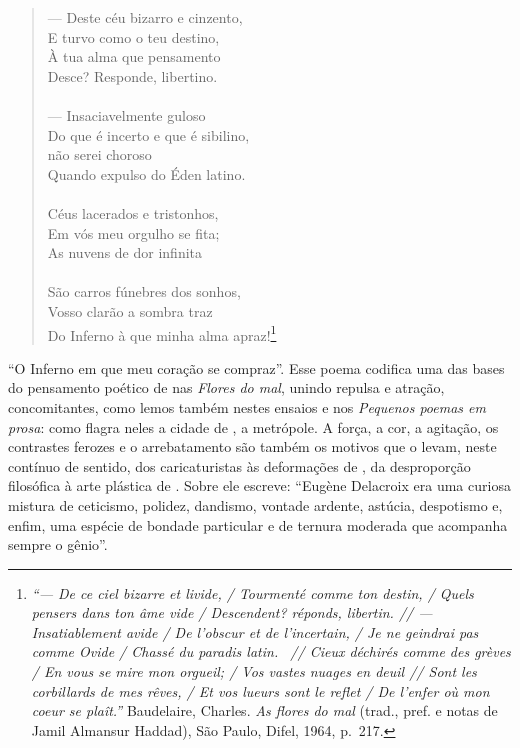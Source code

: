 \begin{hedraquote}
\begin{verse}
--- Deste céu bizarro e cinzento,\\
E turvo como o teu destino, \\
À tua alma que pensamento \\ 
Desce? Responde, libertino. \\ 
\ \\ 
--- Insaciavelmente guloso \\
Do que é incerto e que é sibilino, \\ 
 não serei choroso \\ 
Quando expulso do Éden latino. \\ 
 \ \\
Céus lacerados e tristonhos, \\  
Em vós meu orgulho se fita; \\
As nuvens de dor infinita\\ 
 \ \\
São carros fúnebres dos sonhos, \\ 
Vosso clarão a sombra traz \\ 
Do Inferno à que minha alma apraz!\footnote{ \textit{``--- De ce ciel bizarre et livide, / 
Tourmenté comme ton destin, /
Quels pensers dans ton âme vide / 
Descendent? réponds, libertin. //
--- Insatiablement avide /
De l'obscur et de l'incertain, /
Je ne geindrai pas comme Ovide /
Chassé du paradis latin.  //
Cieux déchirés comme des grèves /
En vous se mire mon orgueil; /
Vos vastes nuages en deuil //
Sont les corbillards de mes rêves, / 
Et vos lueurs sont le reflet /
De l'enfer où mon coeur se plaît.''}
Baudelaire, Charles. \textit{As flores do mal} (trad.,
pref. e notas de Jamil Almansur Haddad), São Paulo, Difel, 1964, p.~217.} 
\end{verse}
\end{hedraquote}

“O Inferno em que meu coração se compraz”. Esse poema codifica uma das
bases do pensamento poético de  nas \textit{Flores do mal},
unindo repulsa e atração, concomitantes, como lemos também nestes
ensaios e nos \textit{Pequenos poemas em prosa}: como flagra neles a
cidade de , a metrópole. A força, a cor, a agitação, os contrastes
ferozes e o arrebatamento são também os motivos que o levam, neste
contínuo de sentido, dos caricaturistas às deformações de , da
desproporção filosófica à arte plástica de . Sobre ele
 escreve: “Eugène Delacroix era uma curiosa mistura de
ceticismo, polidez, dandismo, vontade ardente, astúcia, despotismo e,
enfim, uma espécie de bondade particular e de ternura moderada que
acompanha sempre o gênio”.

